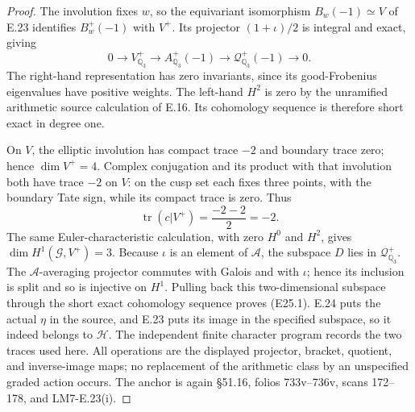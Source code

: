 \documentclass[11pt,oneside]{article}
\begin{document}
\begin{proof}
The involution fixes $w$, so the equivariant isomorphism
$B_w(-1)\simeq V$ of E.23 identifies
$B_w^+(-1)$ with $V^+$. Its projector $(1+\iota)/2$ is
integral and exact, giving
\[
 0\longrightarrow V^+_{\mathbb Q_3}
   \longrightarrow A^+_{\mathbb Q_3}(-1)
   \longrightarrow\mathcal Q^+_{\mathbb Q_3}(-1)
   \longrightarrow0.
\]
The right-hand representation has zero invariants, since
its good-Frobenius eigenvalues have positive weights.
The left-hand $H^2$ is zero by the unramified arithmetic
source calculation of E.16. Its cohomology sequence is
therefore short exact in degree one.

On $V$, the elliptic involution has compact trace $-2$
and boundary trace zero; hence $\dim V^+=4$.
Complex conjugation and its product with that involution
both have trace $-2$ on $V$: on the cusp set each fixes
three points, with the boundary Tate sign, while its
compact trace is zero. Thus
\[
 \operatorname{tr}(c|V^+)=\frac{-2-2}{2}=-2.
\]
The same Euler-characteristic calculation, with zero
$H^0$ and $H^2$, gives $\dim H^1(\mathcal G,V^+)=3$.
Because $\iota$ is an element of $\mathcal A$, the
subspace $D$ lies in $\mathcal Q^+_{\mathbb Q_3}$.
The $\mathcal A$-averaging projector commutes with Galois
and with $\iota$; hence its inclusion is split and so
is injective on $H^1$. Pulling back this two-dimensional
subspace through the short exact cohomology sequence
proves (E25.1). E.24 puts the actual $\eta$ in the source,
and E.23 puts its image in the specified subspace, so it
indeed belongs to $\mathcal H$. The independent finite
character program records the two traces used here.
All operations are the displayed projector, bracket,
quotient, and inverse-image maps; no replacement of the
arithmetic class by an unspecified graded action occurs.
The anchor is again \S51.16, folios 733v--736v, scans
172--178, and LM7-E.23(i).
\end{proof}
\end{document}
